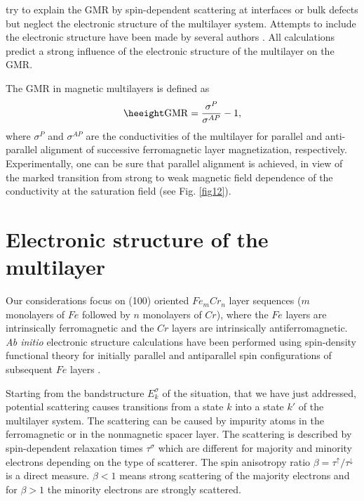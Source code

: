 {try to explain the GMR by spin-dependent scattering at interfaces or
bulk defects but neglect the electronic structure of the multilayer
system.
Attempts to include the electronic structure have been made
by several authors \cite{oguchi93,butler93,schep95,zahn95}.
All calculations predict a strong influence of the electronic structure
of the multilayer on the GMR.\par\noindent
The GMR in magnetic multilayers is defined as
\begin{equation}\label{eq63}
{\rm GMR}=\frac{\sigma^{P}}{\sigma^{AP}} - 1 ,
\end{equation}
where $\sigma^{P}$ and $\sigma^{AP}$ are the conductivities
of the multilayer for parallel and anti-parallel alignment
of successive ferromagnetic layer magnetization, respectively.
Experimentally, one can be sure that parallel alignment is achieved,
in view of the marked transition from strong to weak magnetic field
dependence of the conductivity at the saturation field (see Fig. \ref{fig12}).
%
%
\section*{Electronic structure of the multilayer}
Our considerations focus on
(100) oriented $Fe_mCr_n$ layer sequences ($m$ monolayers of $Fe$ followed
by $n$ monolayers of $Cr$), where the $Fe$ layers are intrinsically
ferromagnetic and the $Cr$ layers are intrinsically antiferromagnetic.
{\it Ab initio} electronic structure calculations have been performed
using spin-density functional theory for initially parallel and antiparallel
spin configurations of subsequent $Fe$ layers \cite{zahn95}.\par
Starting from the bandstructure $E_k^\sigma$ of the situation,
that we have just addressed, potential
scattering causes transitions from a state $k$ into a state $k'$
of the multilayer system.
The scattering can be caused by impurity atoms in the ferromagnetic or in the
nonmagnetic spacer layer. The scattering is described by spin-dependent
relaxation times $\tau^\sigma$ which are different for majority and
minority electrons depending on the type of scatterer.
The spin anisotropy ratio
$\beta=\tau^\uparrow/\tau^\downarrow$ is a direct measure. $\beta<1$
means strong scattering of the majority electrons and for $\beta>1$ the
minority electrons are strongly scattered.
%
%
}

